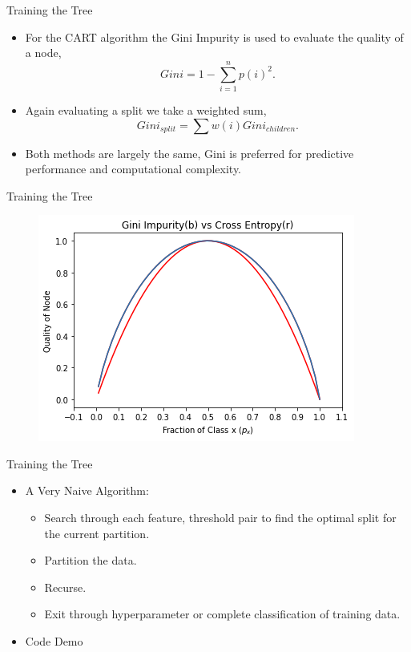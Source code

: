 \documentclass[xcolor={svgnames},
               hyperref={colorlinks,citecolor=DeepPink4,linkcolor=FireBrick,urlcolor=Maroon}]
               {beamer}
\begin{document}
  \begin{frame}{Training the Tree}
    \begin{itemize}
    \item For the CART algorithm the Gini Impurity is used to evaluate the quality of a node, 
    \begin{equation*}
      Gini = 1 - \sum_{i = 1}^n p(i)^2.
    \end{equation*}
    \item Again evaluating a split we take a weighted sum, 
    \begin{equation*}
      Gini_{split} = \sum w(i) Gini_{children}.
    \end{equation*}
    \item Both methods are largely the same, Gini is preferred for predictive performance and computational complexity. 
  \end{itemize}
  \end{frame}


  \begin{frame}{Training the Tree}
    \begin{figure}
      \vspace*{\fill}
      \begin{center}
    \includegraphics[width=.75\textwidth]{GinivsCrossEntropy.png}
      \end{center}
      \vspace*{\fill}
    \end{figure}
  \end{frame}

  


  \begin{frame}{Training the Tree}
    \begin{itemize}
      \item A Very Naive Algorithm:
      \begin{itemize}
        \item Search through each feature, threshold pair to find the optimal split for the current partition. 
        \item Partition the data.
        \item Recurse.
        \item Exit through hyperparameter or complete classification of training data.
      \end{itemize}
      \vfill
      \item Code Demo
    \end{itemize}
  \end{frame}
\end{document}
